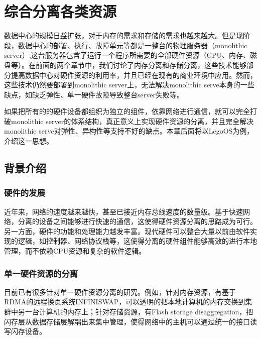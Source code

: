 
\chapter{综合分离各类资源} %

\label{Chapter4} %

数据中心的规模日益扩张，对于内存的需求和存储的需求也越来越大。但是现阶段，数据中心的部署、执行、故障单元等都是一整台的物理服务器（monolithic server）,这台服务器包含了运行一个程序所需要的全部硬件资源（CPU、内存、磁盘等）。在前面的两个章节中，我们讨论了内存分离和存储分离，这些技术能够部分提高数据中心对硬件资源的利用率，并且已经在现有的商业环境中应用。然而，这些技术仍然要部署到monolithic server上，无法解决monolithic serve本身的一些缺点，如缺乏弹性、单一硬件故障导致整台server失败等。

如果把所有的的硬件设备都组织为独立的组件，依靠网络进行通信，就可以完全打破monolithic server的体系结构，真正意义上实现硬件资源的分离，并且完全解决monolithic serve对弹性、异构性等支持不好的缺点。本章后面将以LegoOS为例，介绍这一思想。


\section{背景介绍}

\subsection{硬件的发展}

近年来，网络的速度越来越快，甚至已接近内存总线速度的数量级。基于快速网络，分离的设备之间能够进行快速的通信，这使得硬件资源分离的思路成为可行。另一方面，硬件的功能和处理能力越发丰富。现代硬件可以整合大量以前由软件实现的逻辑，如控制器、网络协议栈等，这使得分离的硬件组件能够高效的进行本地管理，而不依赖CPU资源和复杂的软件逻辑。

\subsection{单一硬件资源的分离}

目前已有很多针对单一硬件资源分离的研究。例如，针对内存资源，有基于RDMA的远程换页系统INFINISWAP\parencite{gu2017efficient}，可以透明的把本地计算机的内存交换到集群中另一台计算机的内存上；针对存储资源，有Flash storage disaggregation\parencite{klimovic2016flash}，把闪存层从数据存储层解耦出来集中管理，使得网络中的主机可以通过统一的接口读写闪存设备。

